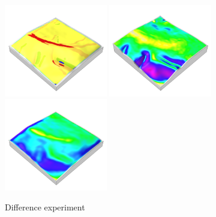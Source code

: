\documentclass[prodmode,acmtochi]{acmsmall} %
\begin{document}
\begin{figure}[h!]
\begin{center}
		\includegraphics[width=0.4\textwidth]{images/render_3d/mean_forms_4.png}
		\includegraphics[width=0.4\textwidth]{images/render_3d/slope_4.png}
		\includegraphics[width=0.4\textwidth]{images/render_3d/mean_slope_4.png}
	\caption{Difference experiment}
	\label{fig:}
\end{center}
\end{figure}


\end{document}
